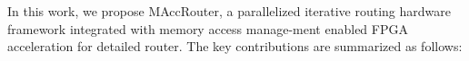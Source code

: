 


In this work, we propose MAccRouter, a parallelized iterative routing hardware framework integrated with memory access manage-ment enabled FPGA acceleration for detailed router. The key contributions are summarized as follows:


